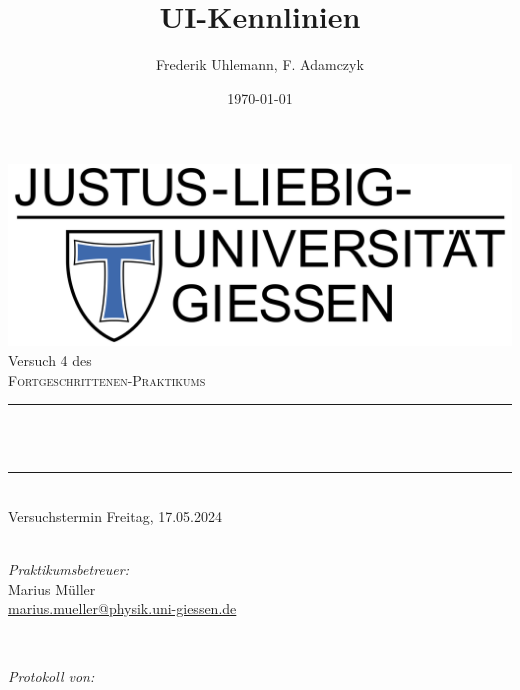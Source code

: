 \documentclass[12pt,a4paper,ngerman]{report}
\title{UI-Kennlinien}		%
\author{Frederik Uhlemann, F. Adamczyk}
\date{\today}
\makeatletter
\let\thetitle\@title
\makeatother
\begin{document}
		
	
	\begin{titlepage}
		\centering
		\vspace*{0.5 cm}
		\includegraphics[width = 0.6 \textwidth]{JLU_Giessen-Logo}	%
		\\[2.0 cm]
		Versuch 4 des\\
		\textsc{\Large  Fortgeschrittenen-Praktikums}\\ [0.3 cm]				%
		\rule{\linewidth}{0.2 mm} \\[0.4 cm]
		{ \huge \bfseries \thetitle}\\%
		\rule{\linewidth}{0.2 mm}\\
		Versuchstermin Freitag, 17.05.2024 \\
		~ \\
		[2.0 cm]
		
		
		\begin{minipage}{0.49\textwidth}
			\begin{flushleft}
				\emph{Praktikumsbetreuer:}\\
				Marius Müller\\
				\small{\href{mailto:marius.mueller@physik.uni-giessen.de}{marius.mueller@physik.uni-giessen.de}}
			\end{flushleft}
		\end{minipage}~
		\begin{minipage}{0.49\textwidth}
			\begin{flushright}
				\emph{Protokoll von:} \\
				

\end{flushright}
\end{minipage}
\end{titlepage}
\end{document}
